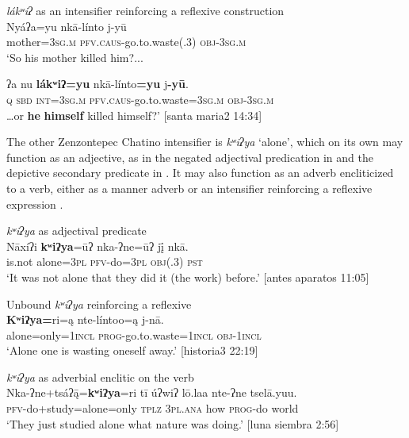 \documentclass[output=paper]{../langscibook}
\begin{document}
\ea\label{ex:campbell:48}
{\textit{lákʷiʔ} as an intensifier reinforcing a reflexive construction}\\
\gll Nyáʔa=yu  nkā-línto  j-yū\\
     mother=\textsc{3sg.m}  \textsc{pfv.caus-}go.to.waste(.3)  \textsc{obj-3sg.m}\\
\glt ‘So his mother killed him?...


\gll ʔa  nu  \textbf{lákʷiʔ=yu}  nkā-línto\textbf{=yu}  j\textbf{{}-yū}.\\
     \textsc{q}  \textsc{sbd}  \textsc{int=3sg}.\textsc{m}  \textsc{pfv}.\textsc{caus}{}-go.to.waste=3\textsc{sg.m}  \textsc{obj}{}-\textsc{3sg}.\textsc{m}\\
\glt …or \textbf{he} \textbf{himself} killed himself?’ [santa maria2 14:34]
\z


The other Zenzontepec Chatino intensifier is \textit{kʷiʔya} ‘alone’, which on its own may function as an adjective, as in the negated adjectival predication in  and the depictive secondary predicate in . It may also function as an adverb encliticized to a verb, either as a manner adverb  or an intensifier reinforcing a reflexive expression .


\ea\label{ex:campbell:49}
{\textit{kʷiʔya} as adjectival predicate}\\
\gll Nāxíʔi  \textbf{kʷiʔya}=ūʔ  nka-ʔne=ūʔ  jį̄  nkā.\\
     is.not  alone=\textsc{3pl}  \textsc{pfv-}do=3\textsc{pl}  \textsc{obj(.3)}  \textsc{pst}\\
\glt ‘It was not alone that they did it (the work) before.’ [antes aparatos 11:05]
\z

\ea\label{ex:campbell:50}
{Unbound \textit{kʷiʔya} reinforcing a reflexive}\\
\gll \textbf{Kʷiʔya=}ri=ą  nte-líntoo=ą  j-nā.\\
     alone=only=\textsc{1incl}  \textsc{prog}{}-go.to.waste=\textsc{1incl}  \textsc{obj}{}-\textsc{1incl}\\
\glt ‘Alone one is wasting oneself away.’ [historia3 22:19]
\z

\ea\label{ex:campbell:51}
{\textit{kʷiʔya} as adverbial enclitic on the verb}\\
\gll Nka-ʔne+tsáʔ\={ą}=\textbf{kʷiʔya}=ri  tī  úʔwiʔ  lō.laa  nte-ʔne  tselā.yuu.\\
     \textsc{pfv-}do+study=alone=only  \textsc{tplz}  \textsc{3pl.ana}  how  \textsc{prog-}do  world\\
\glt ‘They just studied alone what nature was doing.’ [luna siembra 2:56]
\z
\end{document}
